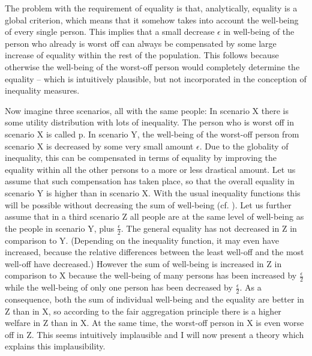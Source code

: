 The problem with the requirement of equality is that, analytically, equality is a global criterion, which means that it somehow takes into account the well-being of every single person. This implies that a small decrease $\epsilon $ in well-being of the person who already is worst off can always be compensated by some large increase of equality within the rest of the population. This follows because otherwise the well-being of the worst-off person would completely determine the equality – which is intuitively plausible, but not incorporated in the conception of inequality measures. 

Now imagine three scenarios, all with the same people: In scenario X there is some utility distribution with lots of inequality. The person who is worst off in scenario X is called p. In scenario Y, the well-being of the worst-off person from scenario X is decreased by some very small amount $\epsilon$. Due to the globality of inequality, this can be compensated in terms of equality by improving the equality within all the other persons to a more or less drastical amount. Let us assume that such compensation has taken place, so that the overall equality in scenario Y is higher than in scenario X. With the usual inequality functions this will be possible without decreasing the sum of well-being (cf. ). Let us further assume that in a third scenario Z all people are at the same level of well-being as the people in scenario Y, plus $\frac{\epsilon}{2}$. The general equality has not decreased in Z in comparison to Y. (Depending on the inequality function, it may even have increased, because the relative differences between the least well-off and the most well-off have decreased.) However the sum of well-being is increased in Z in comparison to X because the well-being of many persons has been increased by $\frac{\epsilon}{2}$ while the well-being of only one person has been decreased by $\frac{\epsilon}{2}$. As a consequence, both the sum of individual well-being and the equality are better in Z than in X, so according to the fair aggregation principle there is a higher welfare in Z than in X. At the same time, the worst-off person in X is even worse off in Z. This seems intuitively implausible and I will now present a theory which explains this implausibility. 

